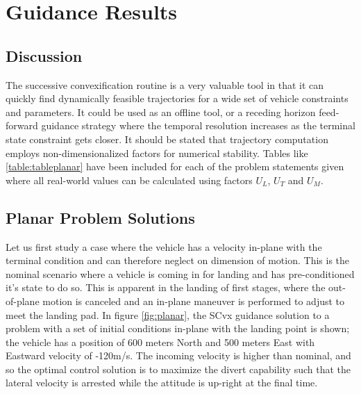 \chapter{Guidance Results}
\label{results}



\section{Discussion}
The successive convexification routine is a very valuable tool in that it can quickly find dynamically feasible trajectories for a wide set of vehicle constraints and parameters. It could be used as an offline tool, or a receding horizon feed-forward guidance strategy where the temporal resolution increases as the terminal state constraint gets closer. It should be stated that trajectory computation employs non-dimensionalized factors for numerical stability. Tables like \ref{table:tableplanar} have been included for each of the problem statements given where all real-world values can be calculated using factors $U_L$, $U_T$ and $U_M$.


\section{Planar Problem Solutions}
Let us first study a case where the vehicle has a velocity in-plane with the terminal condition and can therefore neglect on dimension of motion. This is the nominal scenario where a vehicle is coming in for landing and has pre-conditioned it's  state to do so. This is apparent in the landing of first stages, where the out-of-plane motion is canceled and an in-plane maneuver is performed to adjust to meet the landing pad. In figure \ref{fig:planar}, the SCvx guidance solution to a problem with a set of initial conditions in-plane with the landing point is shown; the vehicle has a position of 600 meters North and 500 meters East with Eastward velocity of -120m/s. The incoming velocity is higher than nominal, and so the optimal control solution is to maximize the divert capability such that the lateral velocity is arrested while the attitude is up-right at the final time.

